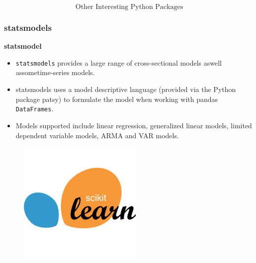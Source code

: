 \documentclass[MASTER.tex]{subfiles}
\begin{document}
 
	
	
\begin{frame}
	\huge
\[ \mbox{Other Interesting Python Packages} \]
\end{frame}

\begin{frame}
	\frametitle{statsmodels}
	\large
	\textbf{statsmodel}
	\begin{itemize}
	\item \texttt{statsmodels} provides a large range of cross-sectional models aswell assometime-series models. 
	\item statsmodels
	uses a model descriptive language (provided via the Python package patsy) to formulate the model
	when working with pandas \texttt{DataFrames}.
	\item Models supported include linear regression, generalized linear
	models, limited dependent variable models, ARMA and VAR models.
	\end{itemize}
\end{frame}



\begin{frame}
	\begin{figure}
\centering
\includegraphics[width=0.7\linewidth]{SKL-logo}

\end{figure}

\end{frame}
\end{document}
